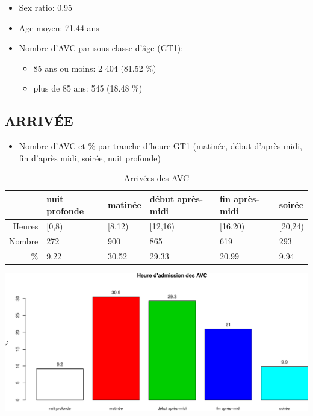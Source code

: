 \documentclass[]{article}
\begin{document}
\begin{itemize}
\itemsep1pt\parskip0pt
\item
  Sex ratio: 0.95
\item
  Age moyen: 71.44 ans
\item
  Nombre d'AVC par sous classe d'âge (GT1):

  \begin{itemize}
  \itemsep1pt\parskip0pt
  \item
    85 ans ou moins: 2 404 (81.52 \%)
  \item
    plus de 85 ans: 545 (18.48 \%)
  \end{itemize}
\end{itemize}

\subsection{ARRIVÉE}\label{arrivee-2}

\begin{itemize}
\itemsep1pt\parskip0pt
\item
  Nombre d'AVC et \% par tranche d'heure GT1 (matinée, début d'après
  midi, fin d'après midi, soirée, nuit profonde)
\end{itemize}

\begin{table}[ht]
\centering
\begin{tabular}{rlllll}
  \hline
 & nuit profonde & matinée & début après-midi & fin après-midi & soirée \\ 
  \hline
Heures & [0,8) & [8,12) & [12,16) & [16,20) & [20,24) \\ 
  Nombre & 272 & 900 & 865 & 619 & 293 \\ 
  \% & 9.22 & 30.52 & 29.33 & 20.99 & 9.94 \\ 
   \hline
\end{tabular}
\caption{Arrivées des AVC} 
\label{avc.arrive}
\end{table}

\includegraphics{Figs/avc_periode-1.pdf}
\end{document}
